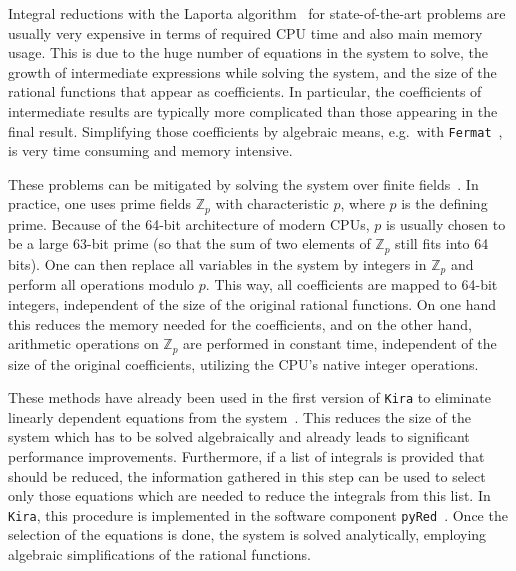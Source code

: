 \documentclass[11pt,a4paper,DIV=11,numbers=noenddot,parskip=half]{scrartcl}
\newcommand{\code}[1]{\texttt{#1}}
\newcommand*{\kira}{\code{Kira}}
\begin{document}
Integral reductions with the Laporta algorithm~\cite{Laporta:2001dd} for state-of-the-art problems are usually very expensive in terms of required CPU time and also main memory usage.
This is due to the huge number of equations in the system to solve, the growth of intermediate expressions while solving the system, and the size of the rational functions that appear as coefficients.
In particular, the coefficients of intermediate results are typically more complicated than those appearing in the final result.
Simplifying those coefficients by algebraic means, e.g.\ with \code{Fermat}~\cite{Fermat}, is very time consuming and memory intensive.

These problems can be mitigated by solving the system over finite fields~\cite{Kauers:2008zz}.
In practice, one uses prime fields $\mathbb{Z}_p$ with characteristic $p$, where $p$ is the defining prime.
Because of the 64-bit architecture of modern CPUs, $p$ is usually chosen to be a large 63-bit prime (so that the sum of two elements of $\mathbb{Z}_p$ still fits into 64 bits).
One can then replace all variables in the system by integers in $\mathbb{Z}_p$ and perform all operations modulo $p$.
This way, all coefficients are mapped to 64-bit integers, independent of the size of the original rational functions.
On one hand this reduces the memory needed for the coefficients, and on the other hand, arithmetic operations on $\mathbb{Z}_p$ are performed in constant time, independent of the size of the original coefficients, utilizing the CPU's native integer operations.

These methods have already been used in the first version of \kira{} to eliminate linearly dependent equations from the system~\cite{Kant:2013vta}.
This reduces the size of the system which has to be solved algebraically and already leads to significant performance improvements.
Furthermore, if a list of integrals is provided that should be reduced, the information gathered in this step can be used to select only those equations which are needed to reduce the integrals from this list.
In \code{Kira}, this procedure is implemented in the software component \code{pyRed}~\cite{Maierhoefer:2017hyi}.
Once the selection of the equations is done, the system is solved analytically, employing algebraic simplifications of the rational functions.
\end{document}

